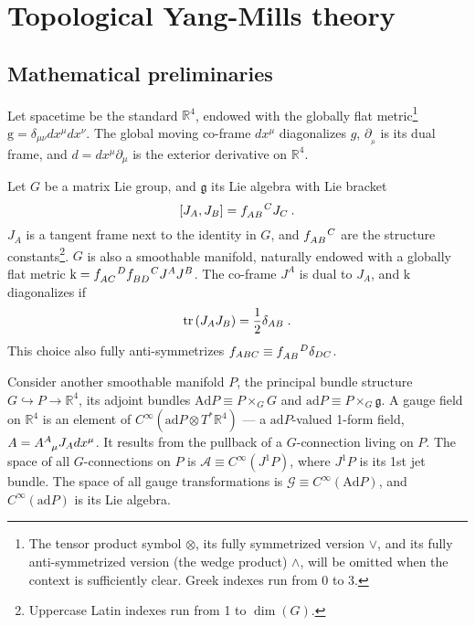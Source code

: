 \documentclass[main.tex]{subfiles}
\begin{document}
\section{Topological Yang-Mills theory}\label{sec:tym}

\subsection{Mathematical preliminaries}\label{ssec:math-preliminaries;sec:tym}

Let spacetime be the standard $\mathbb{R}^4$, endowed with the globally flat metric\footnote{The tensor product symbol $\otimes$, its fully symmetrized version $\vee$, and its fully anti-symmetrized version (the wedge product) $\wedge$, will be omitted when the context is sufficiently clear. Greek indexes run from 0 to 3.} $ \mathrm{g} =\delta_{\mu\nu}dx^\mu dx^\nu$. The global moving co-frame $dx^\mu$ diagonalizes $ g $, $ \partial_{ _\mu } $ is its dual frame, and $d=dx^{\mu}\partial_{ \mu }$ is the exterior derivative on $\mathbb{R}^4$.

Let $G$ be a matrix Lie group, and $\mathfrak{g}$ its Lie algebra with Lie bracket
\begin{equation}
  \label{eq:G lie algebra}
  \left[ J_{A}, J_{B} \right]=\tensor{f}{_{AB}^C}J_C \:.
\end{equation}
$J_A$ is a tangent frame next to the identity in $G$, and $\tensor{f}{_{AB}^C}$ are the structure constants\footnote{Uppercase Latin indexes run from 1 to $\dim\left(G\right)$.}. $G$ is also a smoothable manifold, naturally endowed with a globally flat metric $ \mathrm{k} = \tensor{ f }{ _{AC}^D } \tensor{ f }{ _{BD}^C } J^A J^B $. The co-frame $ J^A $ is dual to $J_A$, and $ \mathrm{k} $ diagonalizes if
\begin{equation}
  \label{eq:orthonormal generators}
  \operatorname{tr}\left(J_A J_B\right) = \frac{1}{2}\delta_{AB} \;.
\end{equation}
This choice also fully anti-symmetrizes $f_{ABC}\equiv \tensor{f}{_{AB}^D}\delta_{DC}$.

Consider another smoothable manifold $ P $, the principal bundle structure $G \hookrightarrow P \rightarrow \mathbb{R}^4$, its adjoint bundles $ \mathrm{Ad} P \equiv P \times_G G $ and $ \mathrm{ad}P \equiv P \times_G \mathfrak{g}$. A gauge field on $ \mathbb{R}^4 $ is an element of $C^\infty \left( \mathrm{ad}P \otimes T^*\mathbb{R}^4 \right)$ --- a $ \mathrm{ad} P $-valued 1-form field, $ A=\tensor{A}{ ^A_\mu }J_A dx^\mu $. It results from the pullback of a $G$-connection living on $ P $. The space of all $G$-connections on $ P $ is $ \mathcal{A} \equiv C^{ \infty } \left( J^1 P \right) $, where $ J^1 P $ is its 1st jet bundle. The space of all gauge transformations is $ \mathcal{G} \equiv C^{ \infty }\left( \mathrm{Ad}P \right) $, and $ C^{ \infty } \left( \mathrm{ad} P \right) $ is its Lie algebra.
\end{document}
